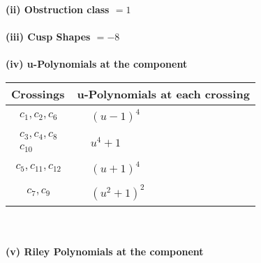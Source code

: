 \documentclass[1p]{elsarticle_modified}
\theoremstyle{definition}
\begin{document}
\flushleft \textbf{(ii) Obstruction class $= 1$}\\~\\
\flushleft \textbf{(iii) Cusp Shapes $= -8$}\\~\\
\newpage\renewcommand{\arraystretch}{1}
\flushleft \textbf{(iv) u-Polynomials at the component}\newline \\
\begin{tabular}{m{50pt}|m{274pt}}
Crossings & \hspace{64pt}u-Polynomials at each crossing \\
\hline $$\begin{aligned}c_{1},c_{2},c_{6}\end{aligned}$$&$\begin{aligned}
&(u-1)^4
\end{aligned}$\\
\hline $$\begin{aligned}c_{3},c_{4},c_{8}\\c_{10}\end{aligned}$$&$\begin{aligned}
&u^4+1
\end{aligned}$\\
\hline $$\begin{aligned}c_{5},c_{11},c_{12}\end{aligned}$$&$\begin{aligned}
&(u+1)^4
\end{aligned}$\\
\hline $$\begin{aligned}c_{7},c_{9}\end{aligned}$$&$\begin{aligned}
&(u^2+1)^2
\end{aligned}$\\
\hline
\end{tabular}\\~\\
\newpage\renewcommand{\arraystretch}{1}
\flushleft \textbf{(v) Riley Polynomials at the component}\newline \\
\end{document}
